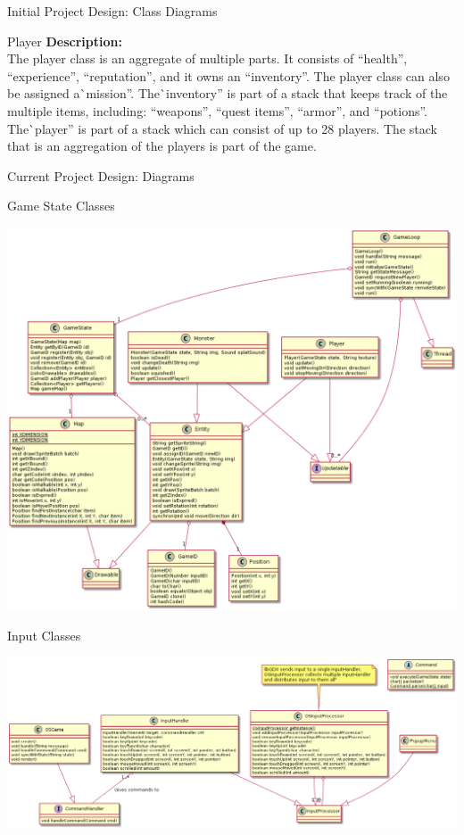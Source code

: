 \documentclass[12pt]{report}
\begin{document}
\begin{chapter}{Initial Project Design: Class Diagrams}
\begin{section}{Player}
     \noindent\textbf{Description:}\\
     The player class is an aggregate of multiple parts. It consists of ``health'', ``experience'', ``reputation'', and it owns an ``inventory''. The player class can also be assigned a\`{ }mission''. The\`{ }inventory'' is part of a stack that keeps track of the multiple items, including: ``weapons'', ``quest items'', ``armor'', and ``potions''. The\`{ }player'' is part of a stack which can consist of up to 28 players. The stack that is an aggregation of the players is part of the game.
  \end{section}
  
 \end{chapter}
 \begin{chapter}{Current Project Design: Diagrams}
   \begin{section}{Game State Classes}
   	\centerline{\includegraphics[width=\textwidth,height=\textheight,keepaspectratio]{./images/gameStateClasses.png}}
   \end{section}
   \begin{section}{Input Classes}
   	\centerline{\includegraphics[width=\textwidth,height=\textheight,keepaspectratio]{./images/inputClasses.png}}

\end{section}
\end{chapter}
\end{document}
